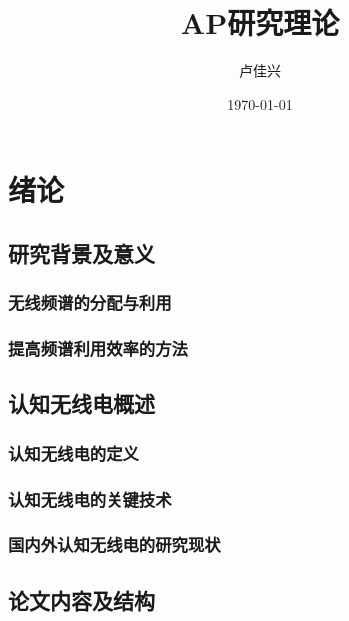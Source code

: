 \documentclass[a4paper,12pt]{book}
\begin{document}

\title{AP研究理论}  %
\author{卢佳兴}  %
\date{\today}    %
\maketitle     %






\chapter{绪论}
\section{研究背景及意义}
\subsection{无线频谱的分配与利用}
\subsection{提高频谱利用效率的方法}
\section{认知无线电概述}
\subsection{认知无线电的定义}
\subsection{认知无线电的关键技术}
\subsection{国内外认知无线电的研究现状}
\section{论文内容及结构}
\end{document}
